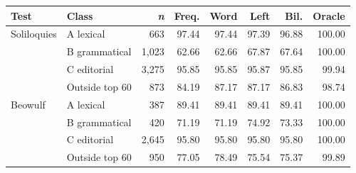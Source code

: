 \begin{tabular}{@{}llrrrrrr@{}}
\toprule
Test & Class & \textit{n} & Freq. & Word & Left & Bil. & Oracle \\
\midrule
Soliloquies & A lexical & 663 & 97.44 & 97.44 & 97.39 & 96.88 & 100.00 \\
 & B grammatical & 1,023 & 62.66 & 62.66 & 67.87 & 67.64 & 100.00 \\
 & C editorial & 3,275 & 95.85 & 95.85 & 95.87 & 95.85 & 99.94 \\
 & Outside top 60 & 873 & 84.19 & 87.17 & 87.17 & 86.83 & 98.74 \\
\addlinespace
Beowulf & A lexical & 387 & 89.41 & 89.41 & 89.41 & 89.41 & 100.00 \\
 & B grammatical & 420 & 71.19 & 71.19 & 74.92 & 73.33 & 100.00 \\
 & C editorial & 2,645 & 95.80 & 95.80 & 95.80 & 95.80 & 100.00 \\
 & Outside top 60 & 950 & 77.05 & 78.49 & 75.54 & 75.37 & 99.89 \\

\bottomrule
\end{tabular}
